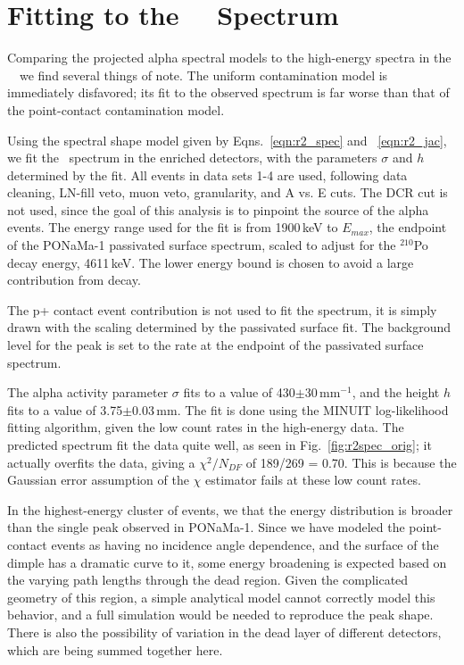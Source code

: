 \section{Fitting to the \MJ\ \DEM\ Spectrum}
Comparing the projected alpha spectral models to the high-energy spectra in the \MJ\ \DEM\, we find several things of note. The uniform contamination model is immediately disfavored; its fit to the observed spectrum is far worse than that of the point-contact contamination model. 

Using the spectral shape model given by Eqns.~\ref{eqn:r2_spec} and ~\ref{eqn:r2_jac}, we fit the \MJ\ spectrum in the enriched detectors, with the parameters $\sigma$ and $h$ determined by the fit. All events in data sets 1-4 are used, following data cleaning, LN-fill veto, muon veto, granularity, and A vs. E cuts. The DCR cut is not used, since the goal of this analysis is to pinpoint the source of the alpha events. The energy range used for the fit is from 1900\,keV to $E_{max}$, the endpoint of the PONaMa-1 passivated surface spectrum, scaled to adjust for the $^{210}$Po decay energy, 4611\,keV. The lower energy bound is chosen to avoid a large contribution from \twonubb decay. 

The p+ contact event contribution is not used to fit the spectrum, it is simply drawn with the scaling determined by the passivated surface fit. The background level for the peak is set to the rate at the endpoint of the passivated surface spectrum. 

The alpha activity parameter $\sigma$ fits to a value of 430$\pm$30\,mm$^{-1}$, and the height $h$ fits to a value of 3.75$\pm$0.03\,mm. The fit is done using the MINUIT log-likelihood fitting algorithm, given the low count rates in the high-energy data.  The predicted spectrum fit the data quite well, as seen in Fig.~\ref{fig:r2spec_orig}; it actually overfits the data, giving a $\chi^2/N_{DF}$ of 189/269 = 0.70. This is because the Gaussian error assumption of the $\chi$ estimator fails at these low count rates. 

In the highest-energy cluster of events, we that the energy distribution is broader than the single peak observed in PONaMa-1. Since we have modeled the point-contact events as having no incidence angle dependence, and the surface of the dimple has a dramatic curve to it, some energy broadening is expected based on the varying path lengths through the dead region. Given the complicated geometry of this region, a simple analytical model cannot correctly model this behavior, and a full simulation would be needed to reproduce the peak shape. There is also the possibility of variation in the dead layer of different detectors, which are being summed together here. 

